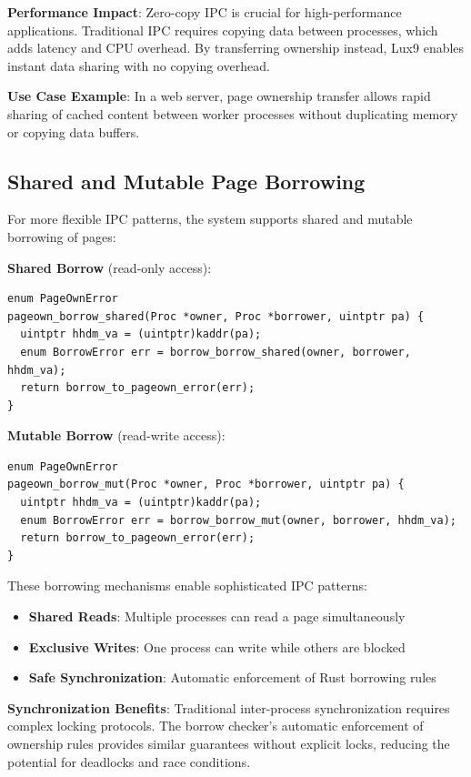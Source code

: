 \documentclass[11pt,letterpaper]{article}
\begin{document}
\textbf{Performance Impact}: Zero-copy IPC is crucial for high-performance applications. Traditional IPC requires copying data between processes, which adds latency and CPU overhead. By transferring ownership instead, Lux9 enables instant data sharing with no copying overhead.

\textbf{Use Case Example}: In a web server, page ownership transfer allows rapid sharing of cached content between worker processes without duplicating memory or copying data buffers.

\subsection{Shared and Mutable Page Borrowing}

For more flexible IPC patterns, the system supports shared and mutable borrowing of pages:

\textbf{Shared Borrow} (read-only access):

\begin{lstlisting}
enum PageOwnError
pageown_borrow_shared(Proc *owner, Proc *borrower, uintptr pa) {
  uintptr hhdm_va = (uintptr)kaddr(pa);
  enum BorrowError err = borrow_borrow_shared(owner, borrower, hhdm_va);
  return borrow_to_pageown_error(err);
}
\end{lstlisting}

\textbf{Mutable Borrow} (read-write access):

\begin{lstlisting}
enum PageOwnError
pageown_borrow_mut(Proc *owner, Proc *borrower, uintptr pa) {
  uintptr hhdm_va = (uintptr)kaddr(pa);
  enum BorrowError err = borrow_borrow_mut(owner, borrower, hhdm_va);
  return borrow_to_pageown_error(err);
}
\end{lstlisting}

These borrowing mechanisms enable sophisticated IPC patterns:
\begin{itemize}
\item \textbf{Shared Reads}: Multiple processes can read a page simultaneously
\item \textbf{Exclusive Writes}: One process can write while others are blocked
\item \textbf{Safe Synchronization}: Automatic enforcement of Rust borrowing rules
\end{itemize}

\textbf{Synchronization Benefits}: Traditional inter-process synchronization requires complex locking protocols. The borrow checker's automatic enforcement of ownership rules provides similar guarantees without explicit locks, reducing the potential for deadlocks and race conditions.
\end{document}
